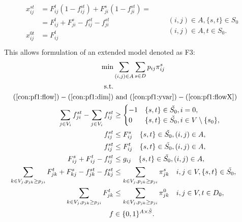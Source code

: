 \begin{align}
\label{eq:tr:fstij1}
\begin{aligned}
x^{st}_{ij}&=F^t_{ij}(1-f^{st}_{ij})+F^{s}_{ji}(1-f^{st}_{ji})= \\
  	   &=  F^t_{ij}+F^s_{ji} - f^{st}_{ij} - f^{st}_{ji}\\
x^{0t}_{ij}&=F^t_{ij}\\
\end{aligned}
&&
\begin{aligned}
\\
(i,j)\in A, \{s,t\}\in S_0\\
(i,j)\in A, t\in S_0.
\end{aligned}
\end{align}
%
This allows formulation of an extended model denoted as F3: 
\begin{subequations}
\begin{align}
\min & \sum\limits_{(i,j) \in A} \sum\limits_{s \in D} p_{ij} \pi^s_{ij}\\ \notag
\text{s.t.}& && \\
\notag(\ref{con:pf1:flow}) - (\ref{con:pf1:dim}) &\text{ and } (\ref{con:pf1:yvar}) - (\ref{con:pf1:flowX})\\
\label{con:pf2:flowHook} \sum\limits_{\substack{ j \in V_i }}f^{st}_{ji}-\sum\limits_{\substack{j\in V_i}}f^{st}_{ij} & \geq 
  \begin{cases}
    -1 & \{s,t\}\in \check{S_0}, i = 0, \\
    0  & \{s,t\}\in \check{S_0}, i\in V\setminus \{s_0\},
  \end{cases}  \\
\label{con:pf2:startInSource}  f^{st}_{ij} & \leq F^s_{ij} \quad \{s,t\}\in \check{S_0}, (i,j)\in A,\\
\label{con:pf2:stopInDest}  f^{st}_{ij} & \leq F^t_{ij} \quad \{s,t\}\in \check{S_0}, (i,j)\in A,\\
\label{con:pf2:stronger}  F^{s}_{ij}+F^{t}_{ij}-f^{st}_{ij} &\leq g_{ij} \quad \{s,t\}\in \check{S_0}, (i,j)\in A,\\ 
\label{con:pf2:sumFImpSumY} \sum\limits_{k\in V_j, p_{jk}\geq p_{ji}}F^{t}_{jk} + F^{s}_{kj} - f^{st}_{jk} - f^{st}_{kj} & \leq \sum\limits_{k\in V_j, p_{jk}\geq p_{ji}}  \pi^{s}_{jk} \quad i,j\in V,\{s,t\}\in \check{S_0},\\
\label{con:pf2:sumFImpSumY2} \sum\limits_{k\in V_j, p_{jk}\geq p_{ji}}F^{t}_{jk} & \leq \sum\limits_{k\in V_j, p_{jk}\geq p_{ji}}  \pi^{0}_{jk} \quad i,j\in V, t\in D_0,\\
\label{con:pf2:dim} f&\in\{0,1\}^{A\times \check{S}}.
\end{align}~
\end{subequations}

